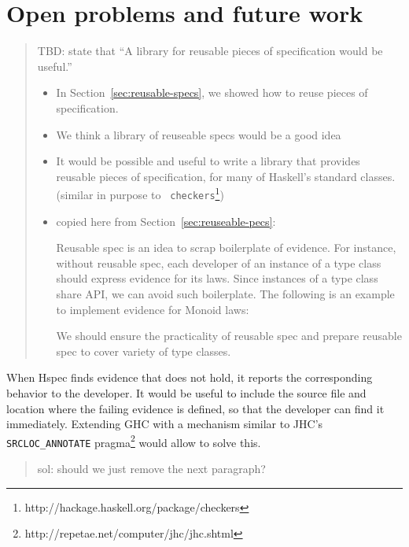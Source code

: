 \documentclass[preprint]{sigplanconf}
\begin{document}
\section{Open problems and future work}


\begin{quote}
    TBD: state that ``A library for reusable pieces of specification would be
    useful.''
\begin{itemize}
    \item
        In Section~\ref{sec:reusable-specs}, we showed how to reuse
        pieces of specification.
    \item
        We think a library of reuseable specs would be a good idea
    \item
        It would be possible and useful to write a library that
        provides reusable pieces of specification, for many of
        Haskell's standard classes.
        (similar in purpose to
        {\tt
        checkers}\footnote{http://hackage.haskell.org/package/checkers})
      \item copied here from Section~\ref{sec:reuseable-pecs}:

        Reusable spec is an idea to scrap boilerplate of evidence.
        For instance, without reusable spec,
        each developer of an instance of a type class should
        express evidence for its laws.
        Since instances of a type class share API,
        we can avoid such boilerplate.
        The following is an example to implement
        evidence for Monoid laws:

        We should ensure the practicality of reusable spec and
        prepare reusable spec to cover variety of type classes.

\end{itemize}
\end{quote}

When Hspec finds evidence that does not hold, it reports the
corresponding behavior to the developer.  It would be useful to
include the source file and location where the failing evidence is
defined, so that the developer can find it immediately.
Extending GHC with a mechanism similar to JHC's
\verb|SRCLOC_ANNOTATE| pragma\footnote{%
http://repetae.net/computer/jhc/jhc.shtml} would allow to solve this.


\begin{quote}
    sol: should we just remove the next paragraph?
\end{quote}
\end{document}
